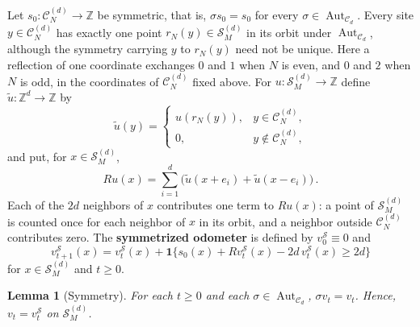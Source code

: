 \documentclass[12pt]{amsart}
\newtheorem{lemma}[theorem]{Lemma}
\newcommand{\Z}{\mathbb{Z}}
\begin{document}
	Let $s_0:\mathcal{C}_N^{(d)}\to\Z$ be symmetric, that is, $\sigma s_0=s_0$ for every $\sigma\in\operatorname{Aut}_{\mathcal{C}_d}$. Every site $y\in\mathcal{C}_N^{(d)}$ has exactly one point $r_N(y)\in\mathcal{S}^{(d)}_M$ in its orbit under $\operatorname{Aut}_{\mathcal{C}_d}$, although the symmetry carrying $y$ to $r_N(y)$ need not be unique. Here a reflection of one coordinate exchanges $0$ and $1$ when $N$ is even, and $0$ and $2$ when $N$ is odd, in the coordinates of $\mathcal{C}_N^{(d)}$ fixed above. For $u:\mathcal{S}^{(d)}_M\to\Z$ define $\widetilde u:\Z^d\to\Z$ by
	\begin{equation*}
	\widetilde u(y)=\begin{cases}u(r_N(y)), & y\in\mathcal{C}_N^{(d)},\\ 0, & y\notin\mathcal{C}_N^{(d)},\end{cases}
	\end{equation*}
	and put, for $x\in\mathcal{S}^{(d)}_M$,
	\begin{equation*}
	Ru(x)=\sum_{i=1}^d\big(\widetilde u(x+e_i)+\widetilde u(x-e_i)\big)\,.
	\end{equation*}
	Each of the $2d$ neighbors of $x$ contributes one term to $Ru(x)$: a point of $\mathcal{S}^{(d)}_M$ is counted once for each neighbor of $x$ in its orbit, and a neighbor outside $\mathcal{C}_N^{(d)}$ contributes zero. The \textbf{symmetrized odometer} is defined by $v_0^{\mathcal S}\equiv0$ and
	\begin{equation*}
	v_{t+1}^{\mathcal S}(x)=v_t^{\mathcal S}(x)+\mathbf 1\{s_0(x)+Rv_t^{\mathcal S}(x)-2d\,v_t^{\mathcal S}(x)\geq2d\}
	\end{equation*}
	for $x\in\mathcal{S}^{(d)}_M$ and $t\geq0$.


	
		
	
	
	\begin{lemma}[Symmetry]\label{symmetry_lemma}
		For each $t \geq 0$ and each $ \sigma \in \operatorname{Aut}_{\mathcal{C}_d}$, $ \sigma v_t = v_t$. Hence, $v_t = v_t^{\mathcal{S}}$ on $\mathcal{S}^{(d)}_M$.
	\end{lemma}
	
\end{document}
